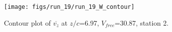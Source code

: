 \begin{figure}[H]
\centering
\texttt{[image: figs/run\_19/run\_19\_W\_contour]}
\caption{Contour plot of $\overline{v_{z}}$ at $z/c$=6.97, $V_{free}$=30.87, station 2.}
\label{fig:run_19_W_contour}
\end{figure}


